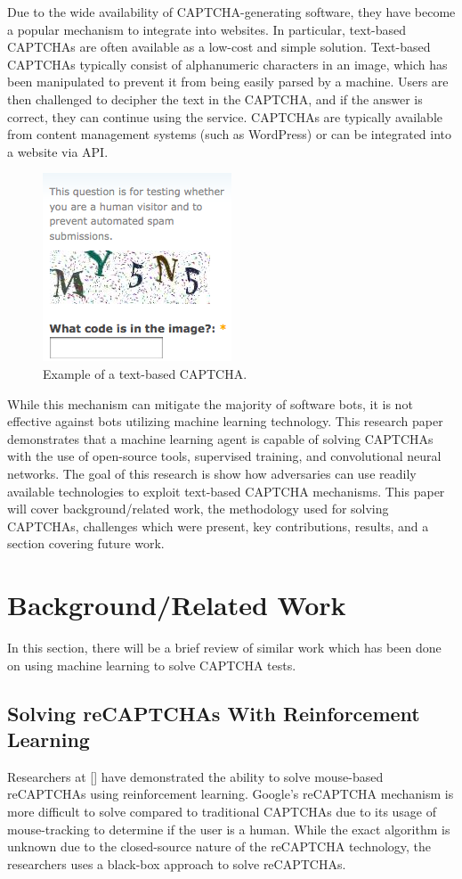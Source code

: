 \documentclass[11pt,conference]{IEEEtran}
\begin{document}
Due to the wide availability of CAPTCHA-generating software, they have become a popular
mechanism to integrate into websites. In particular, text-based CAPTCHAs are
often available as a low-cost and simple solution. Text-based CAPTCHAs
typically consist of alphanumeric characters in an image, which has been
manipulated to prevent it from being easily parsed by a machine. Users are then
challenged to decipher the text in the CAPTCHA, and if the answer is correct,
they can continue using the service. CAPTCHAs are typically available from
content management systems (such as WordPress) or can be integrated into a
website via API.

\begin{figure}[htbp]
    \centerline{\includegraphics[scale=0.7]{images/alphanumeric-captcha.png}}
    \caption{Example of a text-based CAPTCHA.}
    \label{figure}
\end{figure}

While this mechanism can mitigate the majority of software bots, it is not
effective against bots utilizing machine learning technology. This research
paper demonstrates that a machine learning agent is capable of solving CAPTCHAs
with the use of open-source tools, supervised training, and convolutional
neural networks. The goal of this research is show how adversaries can use
readily available technologies to exploit text-based CAPTCHA mechanisms.
This paper will cover background/related work, the methodology  used for solving CAPTCHAs,
challenges which were present, key contributions, results, and a section
covering future work.

\section{Background/Related Work}
In this section, there will be a brief review of similar work which has been
done on using machine learning to solve CAPTCHA tests.

\subsection{Solving reCAPTCHAs With Reinforcement Learning}
Researchers at [] have demonstrated the ability to solve mouse-based reCAPTCHAs using
reinforcement learning. Google's reCAPTCHA mechanism is more difficult to solve
compared to traditional CAPTCHAs due to its usage of mouse-tracking to
determine if the user is a human. While the exact algorithm is unknown due to
the closed-source nature of the reCAPTCHA technology, the researchers uses a
black-box approach to solve reCAPTCHAs.
\end{document}
